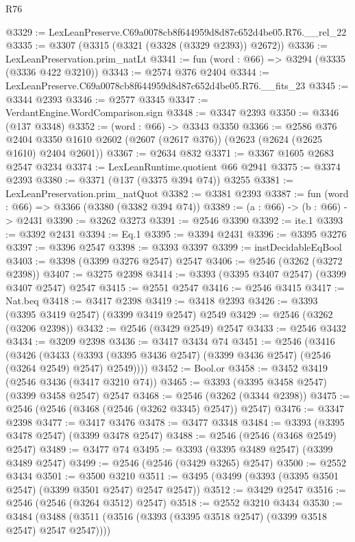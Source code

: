 \begin{lexlean}{R76}
\begin{coremodule}
@3329 := LexLeanPreserve.C69a0078cb8f644959d8d87c652d4be05.R76.__rel_22
@3335 := @3307 (@3315 (@3321 (@3328 (@3329 @2393)) @2672))
@3336 := LexLeanPreservation.prim_natLt
@3341 := fun (word : @66) => @3294 (@3335 (@3336 @422 @3210))
@3343 := @2574 @376 @2404
@3344 := LexLeanPreserve.C69a0078cb8f644959d8d87c652d4be05.R76.__fits_23
@3345 := @3344 @2393
@3346 := @2577 @3345
@3347 := VerdantEngine.WordComparison.sign
@3348 := @3347 @2393
@3350 := @3346 (@137 @3348)
@3352 := (word : @66) -> @3343 @3350
@3366 := @2586
    @376
    @2404
    @3350
    @1610
    @2602
    (@2607 (@2617 @376))
    (@2623 (@2624 (@2625 @1610) @2404 @2601))
@3367 := @2634 @832
@3371 := @3367 @1605 @2683 @2547 @3234
@3374 := LexLeanRuntime.quotient @66 @2941
@3375 := @3374 @2393
@3380 := @3371 (@137 (@3375 @394 @74)) @3255
@3381 := LexLeanPreservation.prim_natQuot
@3382 := @3381 @2393
@3387 := fun (word : @66) => @3366 (@3380 (@3382 @394 @74))
@3389 := (a : @66) -> (b : @66) -> @2431
@3390 := @3262 @3273
@3391 := @2546 @3390
@3392 := ite.{1}
@3393 := @3392 @2431
@3394 := Eq.{1}
@3395 := @3394 @2431
@3396 := @3395 @3276
@3397 := @3396 @2547
@3398 := @3393 @3397
@3399 := instDecidableEqBool
@3403 := @3398 (@3399 @3276 @2547) @2547
@3406 := @2546 (@3262 (@3272 @2398))
@3407 := @3275 @2398
@3414 := @3393 (@3395 @3407 @2547) (@3399 @3407 @2547) @2547
@3415 := @2551 @2547
@3416 := @2546 @3415
@3417 := Nat.beq
@3418 := @3417 @2398
@3419 := @3418 @2393
@3426 := @3393 (@3395 @3419 @2547) (@3399 @3419 @2547) @2549
@3429 := @2546 (@3262 (@3206 @2398))
@3432 := @2546 (@3429 @2549) @2547
@3433 := @2546 @3432
@3434 := @3209 @2398
@3436 := @3417 @3434 @74
@3451 := @2546
    (@3416
      (@3426
        (@3433 (@3393 (@3395 @3436 @2547) (@3399 @3436 @2547) (@2546 (@3264 @2549) @2547) @2549))))
@3452 := Bool.or
@3458 := @3452 @3419 (@2546 @3436 (@3417 @3210 @74))
@3465 := @3393 (@3395 @3458 @2547) (@3399 @3458 @2547) @2547
@3468 := @2546 (@3262 (@3344 @2398))
@3475 := @2546 (@2546 (@3468 (@2546 (@3262 @3345) @2547)) @2547)
@3476 := @3347 @2398
@3477 := @3417 @3476
@3478 := @3477 @3348
@3484 := @3393 (@3395 @3478 @2547) (@3399 @3478 @2547)
@3488 := @2546 (@2546 (@3468 @2549) @2547)
@3489 := @3477 @74
@3495 := @3393 (@3395 @3489 @2547) (@3399 @3489 @2547)
@3499 := @2546 (@2546 (@3429 @3265) @2547)
@3500 := @2552 @3434
@3501 := @3500 @3210
@3511 := @3495 (@3499 (@3393 (@3395 @3501 @2547) (@3399 @3501 @2547) @2547 @2547))
@3512 := @3429 @2547
@3516 := @2546 (@2546 (@3264 @3512) @2547)
@3518 := @2552 @3210 @3434
@3530 := @3484 (@3488 (@3511 (@3516 (@3393 (@3395 @3518 @2547) (@3399 @3518 @2547) @2547 @2547))))

\end{coremodule}
\end{lexlean}
